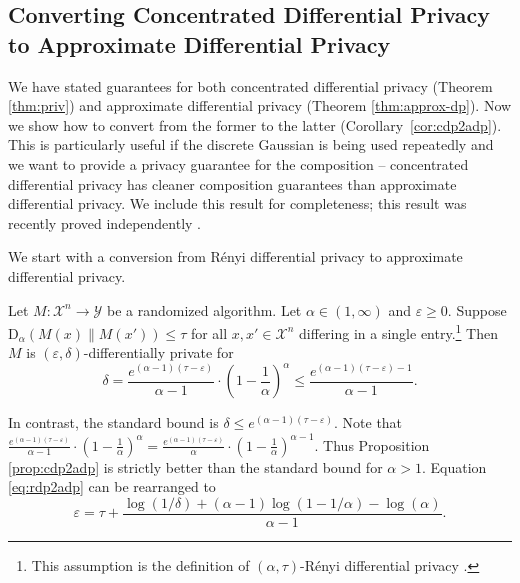 \documentclass{jpcfinal} %
\newcommand{\dr}[3]{\mathrm{D}_{#1}\left(#2\middle\|#3\right)}
\newcommand{\eps}{\varepsilon}
\begin{document}
\subsection{Converting Concentrated Differential Privacy to Approximate Differential Privacy}\label{sec:convert}

We have stated guarantees for both concentrated differential privacy (Theorem \ref{thm:priv}) and approximate differential privacy (Theorem \ref{thm:approx-dp}). Now we show how to convert from the former to the latter (Corollary~\ref{cor:cdp2adp}). This is particularly useful if the discrete Gaussian is being used repeatedly and we want to provide a privacy guarantee for the composition -- concentrated differential privacy has cleaner composition guarantees than approximate differential privacy. We include this result for completeness; this result was recently proved independently \cite[Lem.~1, Eq.~20]{AsoodehLCKS20}.

We start with a conversion from R\'enyi differential privacy to approximate differential privacy. 
\begin{prop}\label{prop:cdp2adp}
Let $M\colon \mathcal{X}^n \to \mathcal{Y}$ be a randomized algorithm. Let $\alpha \in (1,\infty)$ and $\eps\ge0$. Suppose $\dr{\alpha}{M(x)}{M(x')} \le \tau$ for all $x,x'\in\mathcal{X}^n$ differing in a single entry.\footnote{This assumption is the definition of $(\alpha,\tau)$-R\'enyi differential privacy \citep{Mironov17}.}
Then $M$ is $(\eps,\delta)$-differentially private for \begin{equation}
    \delta=\frac{e^{(\alpha-1)(\tau-\eps)}}{\alpha-1} \cdot \left(1-\frac{1}{\alpha}\right)^\alpha \le \frac{e^{(\alpha-1)(\tau-\eps)-1}}{\alpha-1}.\label{eq:rdp2adp}
\end{equation}
\end{prop}

In contrast, the standard bound \citep{DworkRV10,DworkR16,BunS16,Mironov17} is
$
    \delta \le e^{(\alpha-1)(\tau-\eps)}
$.
Note that $\frac{e^{(\alpha-1)(\tau-\eps)}}{\alpha-1} \cdot \left(1-\frac{1}{\alpha}\right)^\alpha = \frac{e^{(\alpha-1)(\tau-\eps)}}{\alpha} \cdot \left(1-\frac{1}{\alpha}\right)^{\alpha-1}$.
Thus Proposition \ref{prop:cdp2adp} is strictly better than the standard bound for $\alpha>1$.
Equation \ref{eq:rdp2adp} can be rearranged to
\begin{equation}
    \eps = \tau + \frac{\log(1/\delta) + (\alpha-1)\log(1-1/\alpha) - \log(\alpha)}{\alpha-1}.
\end{equation}
\end{document}
